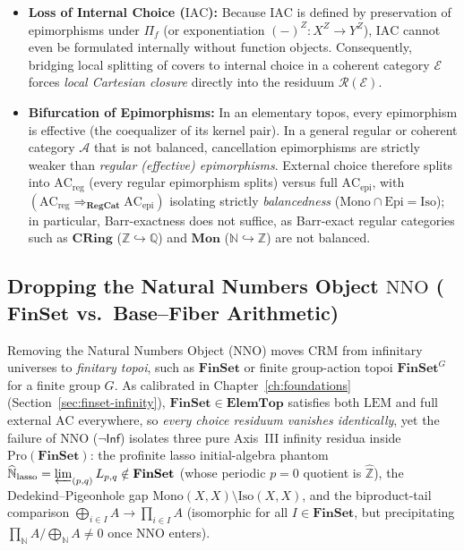 \documentclass[10pt,twoside,openright]{book}
\theoremstyle{crmplain}
\theoremstyle{crmdef}
\theoremstyle{crmremark}
\begin{document}
\begin{itemize}[leftmargin=1.5em]

  \item \textbf{Loss of Internal Choice ($\mathrm{IAC}$):} Because $\mathrm{IAC}$ is defined by preservation of epimorphisms under $\Pi_f$ (or exponentiation $(-)^Z : X^Z \to Y^Z$), $\mathrm{IAC}$ cannot even be formulated internally without function objects. Consequently, bridging local splitting of covers to internal choice in a coherent category $\mathcal{E}$ forces \emph{local Cartesian closure} directly into the residuum $\mathcal{R}(\mathcal{E})$.

  \item \textbf{Bifurcation of Epimorphisms:} In an elementary topos, every epimorphism is effective (the coequalizer of its kernel pair). In a general regular or coherent category $\mathcal{A}$ that is not balanced, cancellation epimorphisms are strictly weaker than \emph{regular (effective) epimorphisms}. External choice therefore splits into $\mathrm{AC}_{\mathrm{reg}}$ (every regular epimorphism splits) versus full $\mathrm{AC}_{\mathrm{epi}}$, with $(\mathrm{AC}_{\mathrm{reg}} \Rightarrow_{\mathbf{RegCat}} \mathrm{AC}_{\mathrm{epi}})$ isolating strictly \emph{balancedness} ($\mathrm{Mono} \cap \mathrm{Epi} = \mathrm{Iso}$); in particular, Barr-exactness does not suffice, as Barr-exact regular categories such as $\mathbf{CRing}$ ($\mathbb{Z} \hookrightarrow \mathbb{Q}$) and $\mathbf{Mon}$ ($\mathbb{N} \hookrightarrow \mathbb{Z}$) are not balanced.

\end{itemize}

\subsection{\texorpdfstring{Dropping the Natural Numbers Object $\mathrm{NNO}$ ($\mathbf{FinSet}$ vs.\ Base--Fiber Arithmetic)}{Dropping the Natural Numbers Object NNO (FinSet vs. Base-Fiber Arithmetic)}}

Removing the Natural Numbers Object ($\mathrm{NNO}$) moves $\mathrm{CRM}$ from infinitary universes to \emph{finitary topoi}, such as $\mathbf{FinSet}$ or finite group-action topoi $\mathbf{FinSet}^G$ for a finite group $G$. As calibrated in Chapter~\ref{ch:foundations} (Section~\ref{sec:finset-infinity}), $\mathbf{FinSet} \in \mathbf{ElemTop}$ satisfies both $\mathrm{LEM}$ and full external $\mathrm{AC}$ everywhere, so \emph{every choice residuum vanishes identically}, yet the failure of $\mathrm{NNO}$ ($\neg\mathsf{Inf}$) isolates three pure Axis~III infinity residua inside $\mathrm{Pro}(\mathbf{FinSet})$: the profinite lasso initial-algebra phantom $\widehat{\mathbb{N}}_{\mathrm{lasso}} = \varprojlim_{(p,q)} L_{p,q} \notin \mathbf{FinSet}$ (whose periodic $p=0$ quotient is $\widehat{\mathbb{Z}}$), the Dedekind--Pigeonhole gap $\mathrm{Mono}(X,X)\setminus\mathrm{Iso}(X,X)$, and the biproduct-tail comparison $\bigoplus_{i \in I} A \to \prod_{i \in I} A$ (isomorphic for all $I \in \mathbf{FinSet}$, but precipitating $\prod_{\mathbb{N}} A / \bigoplus_{\mathbb{N}} A \neq 0$ once $\mathrm{NNO}$ enters).
\end{document}

